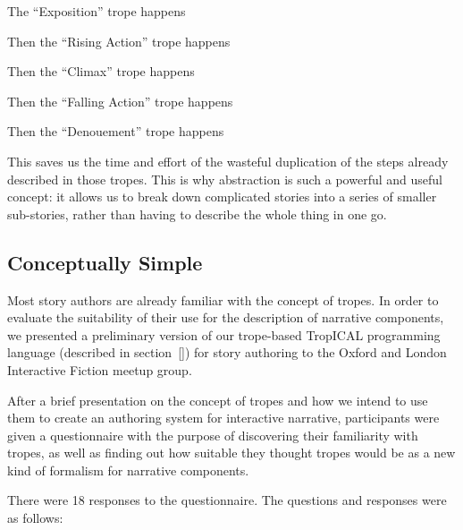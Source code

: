 \begin{compactitem}
  \item The ``Exposition'' trope happens
  \item Then the ``Rising Action'' trope happens
  \item Then the ``Climax'' trope happens
  \item Then the ``Falling Action'' trope happens
  \item Then the ``Denouement'' trope happens
\end{compactitem}

This saves us the time and effort of the wasteful duplication of the steps
already described in those tropes. This is why abstraction is such a powerful
and useful concept: it allows us to break down complicated stories into a series
of smaller sub-stories, rather than having to describe the whole thing in one go.

\subsection{Conceptually Simple}\label{sec:tropes-simple}

Most story authors are already familiar with the concept of tropes. In order to
evaluate the suitability of their use for the description of narrative
components, we presented a preliminary version of our trope-based TropICAL programming
language (described in section~\ref{}) for story authoring to the Oxford and London Interactive Fiction meetup group.

After a brief presentation on the concept of tropes and how we intend to use
them to create an authoring system for interactive narrative, participants were
given a questionnaire with the purpose of discovering their familiarity with
tropes, as well as finding out how suitable they thought tropes would be as a
new kind of formalism for narrative components.

There were 18 responses to the questionnaire. The questions and responses were as follows:

